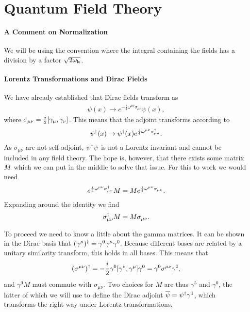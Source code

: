 \section{Quantum Field Theory}

\paragraph{A Comment on Normalization}
We will be using the convention where the integral containing the fields has a division by a factor $\sqrt{2\omega_{\vb{k}}}$.

\paragraph{Lorentz Transformations and Dirac Fields}
We have already established that Dirac fields transform as
\begin{align*}
	\psi(x) \to e^{-\frac{i}{4}\omega^{\mu\nu}\sigma_{\mu\nu}}\psi(x),
\end{align*}
where $\sigma_{\mu\nu} = \frac{i}{2}\comm{\gamma_{\mu}}{\gamma_{\nu}}$. This means that the adjoint transforms according to
\begin{align*}
	\psi^{\dagger}(x) \to \psi^{\dagger}(x)e^{\frac{i}{4}\omega^{\mu\nu}\sigma_{\mu\nu}^{\dagger}}.
\end{align*}
As $\sigma_{\mu\nu}$ are not self-adjoint, $\psi^{\dagger}\psi$ is not a Lorentz invariant and cannot be included in any field theory. The hope is, however, that there exists some matrix $M$ which we can put in the middle to solve that issue. For this to work we would need
\begin{align*}
	e^{\frac{i}{4}\omega^{\mu\nu}\sigma_{\mu\nu}^{\dagger}}M = Me^{\frac{i}{4}\omega^{\mu\nu}\sigma_{\mu\nu}}.
\end{align*}
Expanding around the identity we find
\begin{align*}
	\sigma_{\mu\nu}^{\dagger} M = M\sigma_{\mu\nu}.
\end{align*}

To proceed we need to know a little about the gamma matrices. It can be shown in the Dirac basis that $(\gamma^{\mu})^{\dagger} = \gamma^{0}\gamma^{\mu}\gamma^{0}$. Because different bases are related by a unitary similarity transform, this holds in all bases. This means that
\begin{align*}
	(\sigma^{\mu\nu})\adj = -\frac{i}{2}\gamma^{0}\comm{\gamma^{\nu}}{\gamma^{\mu}}\gamma^{0} = \gamma^{0}\sigma^{\mu\nu}\gamma^{0},
\end{align*}
and $\gamma^{0}M$ must commute with $\sigma_{\mu\nu}$. Two choices for $M$ are thus $\gamma^{5}$ and $\gamma^{0}$, the latter of which we will use to define the Dirac adjoint $\overline{\psi} = \psi^{\dagger}\gamma^{0}$, which transforms the right way under Lorentz transformations.

